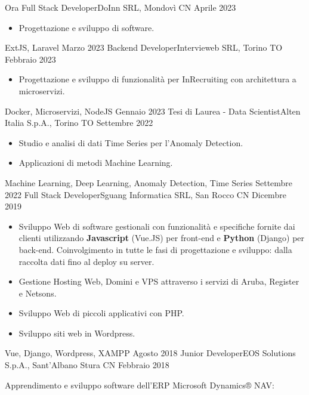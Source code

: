 \begin{experiences}
	\experience
	{Ora}   {Full Stack Developer}{DoInn SRL, Mondovì CN}
	{Aprile 2023} {
		\begin{itemize}
			\item Progettazione e sviluppo di software.
		\end{itemize}
	}
	{ExtJS, Laravel}
	\emptySeparator
	\emptySeparator
	\experience
	{Marzo 2023}   {Backend Developer}{Intervieweb SRL, Torino TO}
	{Febbraio 2023} {
		\begin{itemize}
			\item Progettazione e sviluppo di funzionalità per InRecruiting con architettura a microservizi.
		\end{itemize}
	}
	{Docker, Microservizi, NodeJS}
	\emptySeparator
	\emptySeparator
	\experience
	{Gennaio 2023}   {Tesi di Laurea - Data Scientist}{Alten Italia S.p.A., Torino TO}
	{Settembre 2022} {
		\begin{itemize}
			\item Studio e analisi di dati Time Series per l'Anomaly Detection.
			\item Applicazioni di metodi Machine Learning.
		\end{itemize}
	}
	{Machine Learning, Deep Learning, Anomaly Detection, Time Series}
	\emptySeparator
	\emptySeparator
	\experience
	{Settembre 2022}   {Full Stack Developer}{Sguang Informatica SRL, San Rocco CN}
	{Dicembre 2019} {
		\begin{itemize}
			\item Sviluppo Web di software gestionali con funzionalità e specifiche fornite dai clienti utilizzando \textbf{Javascript} (Vue.JS) per front-end e \textbf{Python} (Django) per back-end. Coinvolgimento in tutte le fasi di progettazione e sviluppo: dalla raccolta dati fino al deploy su server. 
			\item Gestione Hosting Web, Domini e VPS attraverso i servizi di Aruba, Register e Netsons.
			\item Sviluppo Web di piccoli applicativi con PHP.
			\item Sviluppo siti web in Wordpress.                         
		\end{itemize}
	}
	{Vue, Django, Wordpress, XAMPP}
	\emptySeparator
	\emptySeparator
	\experience
	{Agosto 2018} {Junior Developer}{EOS Solutions S.p.A., Sant'Albano Stura CN}
	{Febbraio 2018}    {
		Apprendimento e sviluppo software dell'ERP Microsoft Dynamics® NAV:
		\begin{itemize}

\end{itemize}}
\end{experiences}
